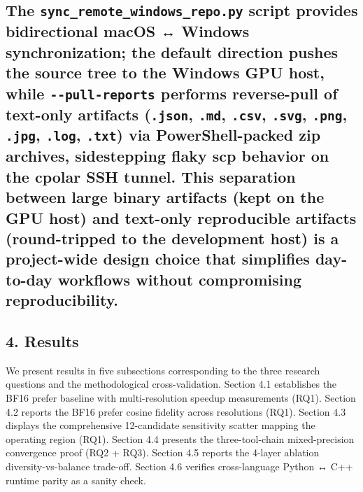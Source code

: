 \documentclass[
]{article}
\begin{document}
\subsection{\texorpdfstring{The \texttt{sync\_remote\_windows\_repo.py}
script provides bidirectional macOS ↔ Windows synchronization; the
default direction pushes the source tree to the Windows GPU host, while
\texttt{-\/-pull-reports} performs reverse-pull of text-only artifacts
(\texttt{.json}, \texttt{.md}, \texttt{.csv}, \texttt{.svg},
\texttt{.png}, \texttt{.jpg}, \texttt{.log}, \texttt{.txt}) via
PowerShell-packed zip archives, sidestepping flaky scp behavior on the
cpolar SSH tunnel. This separation between large binary artifacts (kept
on the GPU host) and text-only reproducible artifacts (round-tripped to
the development host) is a project-wide design choice that simplifies
day-to-day workflows without compromising
reproducibility.}{The sync\_remote\_windows\_repo.py script provides bidirectional macOS ↔ Windows synchronization; the default direction pushes the source tree to the Windows GPU host, while -\/-pull-reports performs reverse-pull of text-only artifacts (.json, .md, .csv, .svg, .png, .jpg, .log, .txt) via PowerShell-packed zip archives, sidestepping flaky scp behavior on the cpolar SSH tunnel. This separation between large binary artifacts (kept on the GPU host) and text-only reproducible artifacts (round-tripped to the development host) is a project-wide design choice that simplifies day-to-day workflows without compromising reproducibility.}}\label{the-sync_remote_windows_repo.py-script-provides-bidirectional-macos-windows-synchronization-the-default-direction-pushes-the-source-tree-to-the-windows-gpu-host-while---pull-reports-performs-reverse-pull-of-text-only-artifacts-.json-.md-.csv-.svg-.png-.jpg-.log-.txt-via-powershell-packed-zip-archives-sidestepping-flaky-scp-behavior-on-the-cpolar-ssh-tunnel.-this-separation-between-large-binary-artifacts-kept-on-the-gpu-host-and-text-only-reproducible-artifacts-round-tripped-to-the-development-host-is-a-project-wide-design-choice-that-simplifies-day-to-day-workflows-without-compromising-reproducibility.}

\subsection{4. Results}\label{results}

We present results in five subsections corresponding to the three
research questions and the methodological cross-validation. Section 4.1
establishes the BF16 prefer baseline with multi-resolution speedup
measurements (RQ1). Section 4.2 reports the BF16 prefer cosine fidelity
across resolutions (RQ1). Section 4.3 displays the comprehensive
12-candidate sensitivity scatter mapping the operating region (RQ1).
Section 4.4 presents the three-tool-chain mixed-precision convergence
proof (RQ2 + RQ3). Section 4.5 reports the 4-layer ablation
diversity-vs-balance trade-off. Section 4.6 verifies cross-language
Python ↔ C++ runtime parity as a sanity check.
\end{document}

